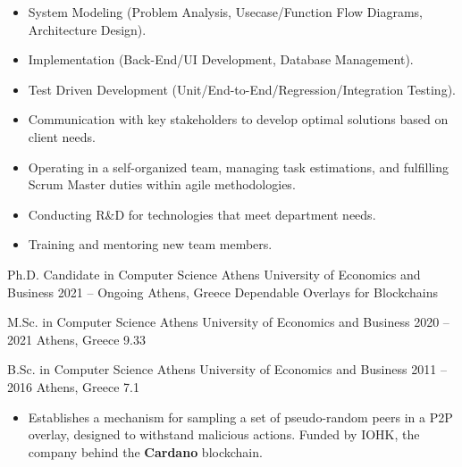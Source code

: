 \documentclass[10pt,a4paper,ragged2e,withhyper]{altacv}
\begin{document}
\begin{paracol}{2}
            \begin{itemize}
                \item System Modeling (Problem Analysis, Usecase/Function Flow Diagrams, Architecture Design).
                \item Implementation (Back-End/UI Development, Database Management).
                \item Test Driven Development (Unit/End-to-End/Regression/Integration Testing).
                \item Communication with key stakeholders to develop optimal solutions based on client needs.
                \item Operating in a self-organized team, managing task estimations, and fulfilling Scrum Master duties within agile methodologies.
                \item Conducting R\&D for technologies that meet department needs.
                \item Training and mentoring new team members.
            \end{itemize}
            
        

        \cveducation
          {Ph.D. Candidate in Computer Science}
          {Athens University of Economics and Business}
          {2021 -- Ongoing}
          {Athens, Greece}
          {}
          {Dependable Overlays for Blockchains}

        \cveducation
          {M.Sc. in Computer Science}
          {Athens University of Economics and Business}
          {2020 -- 2021}
          {Athens, Greece}
          {9.33}
          {}

        \cveducation
          {B.Sc. in Computer Science}
          {Athens University of Economics and Business}
          {2011 -- 2016}
          {Athens, Greece}
          {7.1}
          {}

        \hfill

            \begin{itemize}
                \item[] Establishes a mechanism for sampling a set of pseudo-random peers in a P2P overlay, designed to withstand malicious actions. Funded by IOHK, the company behind the \textbf{Cardano} blockchain.
            \end{itemize}
            \divider


\end{paracol}
\end{document}
